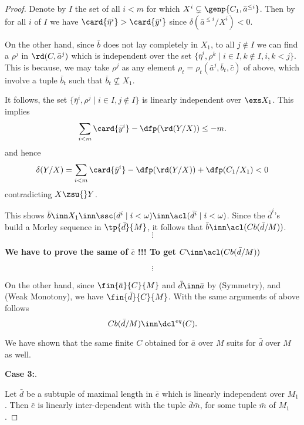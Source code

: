 \begin{proof}
\smallskip
Denote by $I$ the set of all $i<m$ for which $X^{i}\subsetneq\genp{C_{1},\bar a^{\leq i}}$. Then by 
for all $i$ of $I$ we have $\card{\bar\eta^{i}}>\card{\bar y^{i}}$ since $\delta(\bar a^{\leq i}/X^{i})<0$.


On the other hand, since $\bar b$ does not lay completely in $X_{1}$, to all $j\notin I$
we can find a $\rho^{j}$ in $\rd(C,\bar a^{j})$ which is independent over the set $\{\bar\eta^{i},\rho^{k}\mid i\in I,k\notin I,i,k<j\}$.
This is because, we may take $\rho^{j}$ as any element $\rho_{t}=\rho_{t}(\bar a^{j},\bar b_{t},\bar c)$ of  above, which involve a tuple $\bar b_{t}$ such
that $\bar b_{t}\nsubseteq X_{1}$.

%

It follows, the set $\{\bar\eta^{i},\rho^{j}\mid i\in I, j\notin I\}$ is linearly independent over $\exs X_{1}$.
This implies
$$\sum_{i<m}\card{\bar y^{i}}-\dfp(\rd(Y/X))\leq-m.$$
and hence
$$\delta(Y/X)=\sum_{i<m}\card{\bar y^{i}}-\dfp(\rd(Y/X))+\dfp(C_{1}/X_{1})<0$$
contradicting $X\zsu{}Y$.

\medskip
This shows $\bar b\inn X_{1}\inn\ssc(d^{i}\mid i<\omega)\inn\acl(\bar d^{i}\mid i<\omega)$. Since the $\bar d^{i}$'s build a Morley
sequence in $\tp{\bar d}{M}$, it follows that $\bar b\inn\acl(Cb(\bar d/M))$.
$$\vdots$$
\begin{center}
{\bf We have to prove the same of $\bar c$ !!! To get $C\inn\acl(Cb(\bar d/M))$}
\end{center}
$$\vdots$$

On the other hand, since $\fin{\bar a}{C}{M}$ and $\bar d\inn%
\bar a$ by (Symmetry), %
and (Weak Monotony), we have $\fin{\bar d}{C}{M}$. With the same arguments of above follows $$Cb(\bar d/M)\inn\dcl^{eq}(C).$$

We have shown that the same finite $C$ obtained for $\bar a$ over $M$ suits for $\bar d$ over $M$ as well.

\medskip\noindent
{\bf Case 3:}.

\smallskip
Let $\bar d$ be a subtuple of maximal length in $\bar e$ which is linearly independent over $M_{1}$.
Then $\bar e$ is linearly inter-dependent with the tuple $\bar d\bar m$, for some tuple $\bar m$ of $M_{1}$.


\end{proof}
